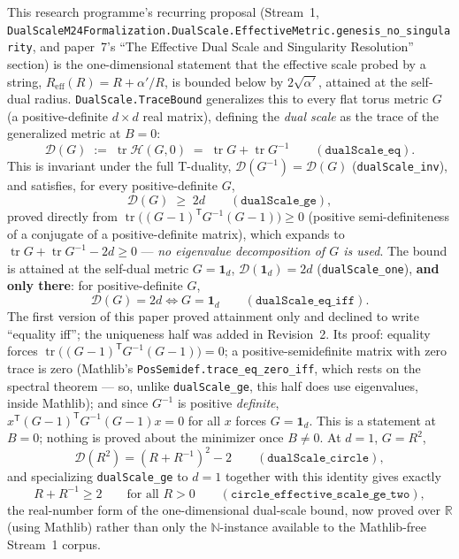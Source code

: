 \documentclass[11pt,a4paper]{article}
\theoremstyle{remark}
\begin{document}
This research programme's recurring proposal (Stream~1,
\texttt{DualScaleM24Formalization.DualScale.EffectiveMetric.genesis\_no\_singularity}, and paper~7's
``The Effective Dual Scale and Singularity Resolution'' section) is the one-dimensional statement that the effective scale probed by a
string, $R_{\mathrm{eff}}(R)=R+\alpha'/R$, is bounded below by $2\sqrt{\alpha'}$, attained at the
self-dual radius. \texttt{DualScale.TraceBound} generalizes this to every flat torus metric
$G$ (a positive-definite $d\times d$ real matrix), defining the \emph{dual scale} as the trace of
the generalized metric at $B=0$:
\begin{equation}
  \mathcal{D}(G) \;:=\; \operatorname{tr}\mathcal{H}(G,0) \;=\; \operatorname{tr}G + \operatorname{tr}G^{-1}
  \qquad (\texttt{dualScale\_eq}).
\end{equation}
This is invariant under the full T-duality, $\mathcal{D}(G^{-1})=\mathcal{D}(G)$
(\texttt{dualScale\_inv}), and satisfies, for every positive-definite $G$,
\begin{equation}
  \mathcal{D}(G) \;\ge\; 2d \qquad (\texttt{dualScale\_ge}),
\end{equation}
proved directly from $\operatorname{tr}\big((G-1)^{\mathsf T}G^{-1}(G-1)\big)\ge 0$ (positive
semi-definiteness of a conjugate of a positive-definite matrix), which expands to
$\operatorname{tr}G+\operatorname{tr}G^{-1}-2d\ge0$ --- \emph{no eigenvalue decomposition of $G$
is used}. The bound is attained at the self-dual metric $G=\mathbf 1_d$,
$\mathcal{D}(\mathbf 1_d)=2d$ (\texttt{dualScale\_one}), \textbf{and only there}: for
positive-definite $G$,
\begin{equation}
  \mathcal{D}(G)=2d \iff G=\mathbf 1_d \qquad(\texttt{dualScale\_eq\_iff}).
\end{equation}
The first version of this paper proved attainment only and declined to write ``equality iff''; the
uniqueness half was added in Revision~2. Its proof: equality forces
$\operatorname{tr}\big((G-1)^{\mathsf T}G^{-1}(G-1)\big)=0$; a positive-semidefinite matrix with zero
trace is zero (Mathlib's \texttt{PosSemidef.trace\_eq\_zero\_iff}, which rests on the spectral
theorem --- so, unlike \texttt{dualScale\_ge}, this half does use eigenvalues, inside Mathlib); and
since $G^{-1}$ is positive \emph{definite}, $x^{\mathsf T}(G-1)^{\mathsf T}G^{-1}(G-1)x=0$ for all $x$
forces $G=\mathbf 1_d$. This is a statement at $B=0$; nothing is proved about the minimizer once
$B\ne0$. At $d=1$, $G=R^2$,
\begin{equation}
  \mathcal{D}(R^2) = (R+R^{-1})^2-2 \qquad(\texttt{dualScale\_circle}),
\end{equation}
and specializing \texttt{dualScale\_ge} to $d=1$ together with this identity gives exactly
\begin{equation}
  R + R^{-1} \ge 2 \qquad \text{for all } R>0 \qquad (\texttt{circle\_effective\_scale\_ge\_two}),
\end{equation}
the real-number form of the one-dimensional dual-scale bound, now proved over $\mathbb{R}$ (using
Mathlib) rather than only the $\mathbb{N}$-instance available to the Mathlib-free Stream~1 corpus.
\end{document}
